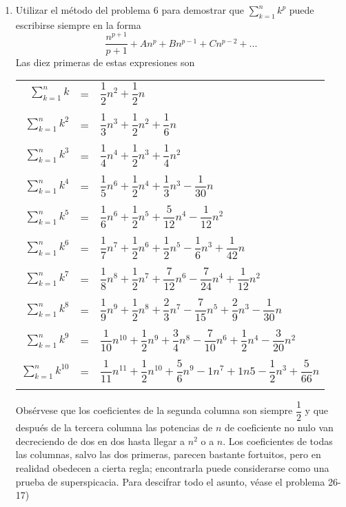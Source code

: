 \begin{enumerate}
\item Utilizar el método del problema 6 para demostrar que $\displaystyle\sum_{k=1}^n k^p$ puede escribirse siempre en la forma $$\dfrac{n^{p+1}}{p+1} + An^p + Bn^{p-1} + Cn^{p-2} + ...$$
Las diez primeras de estas expresiones son
\begin{center}
\begin{tabular}{r c l}
$\displaystyle\sum_{k=1}^n k$&=&$\dfrac{1}{2}n^2 + \dfrac{1}{2}n$\\\\
$\displaystyle\sum_{k=1}^n k^2$&=&$\dfrac{1}{3} n^3 + \dfrac{1}{2}n^2 + \dfrac{1}{6}n$\\\\
$\displaystyle\sum_{k=1}^n k^3$&=&$\dfrac{1}{4}n^4 + \dfrac{1}{2} n^3 + \dfrac{1}{4} n^2$\\\\
$\displaystyle\sum_{k=1}^n k^4$&=&$\dfrac{1}{5} n^6 + \dfrac{1}{2} n^4 + \dfrac{1}{3} n^3 - \dfrac{1}{30}n$\\\\
$\displaystyle\sum_{k=1}^n k^5$&=&$\dfrac{1}{6}n^6 + \dfrac{1}{2} n^5 + \dfrac{5}{12}n^4 - \dfrac{1}{12}n^2$\\\\
$\displaystyle\sum_{k=1}^n k^6$&=&$\dfrac{1}{7}n^7 + \dfrac{1}{2}n^6 + \dfrac{1}{2}n^5 - \dfrac{1}{6}n^3 + \dfrac{1}{42}n$\\\\
$\displaystyle\sum_{k=1}^n k^7$&=&$\dfrac{1}{8}n^8 + \dfrac{1}{2}n^7 + \dfrac{7}{12}n^6 - \dfrac{7}{24}n^4 + \dfrac{1}{12}n^2$\\\\
$\displaystyle\sum_{k=1}^n k^8$&=&$\dfrac{1}{9}n^9 + \dfrac{1}{2}n^8 + \dfrac{2}{3}n^7 - \dfrac{7}{15}n^5 + \dfrac{2}{9}n^3 - \dfrac{1}{30}n$\\\\
$\displaystyle\sum_{k=1}^n k^9$&=&$\dfrac{1}{10}n^{10} + \dfrac{1}{2} n^9 + \dfrac{3}{4}n^8 - \dfrac{7}{10}n^6 + \dfrac{1}{2}n^4 - \dfrac{3}{20} n^2$\\\\
$\displaystyle\sum_{k=1}^n k^10$&=&$\dfrac{1}{11}n^{11} + \dfrac{1}{2}n^{10} + \dfrac{5}{6}n^9 - 1n^7 + 1n5 - \dfrac{1}{2}n^3 + \dfrac{5}{66}n$\\\\
\end{tabular}
\end{center}
Obsérvese que los coeficientes de la segunda columna son siempre $\dfrac{1}{2}$ y que después de la tercera columna las potencias de $n$ de coeficiente no nulo van decreciendo de dos en dos hasta llegar a $n^2$ o a $n$. Los coeficientes de todas las columnas, salvo las dos primeras, parecen bastante fortuitos, pero en realidad obedecen a cierta regla; encontrarla puede considerarse como una prueba de superspicacia. Para descifrar todo el asunto, véase el problema 26-17)\\\\

\end{enumerate}
